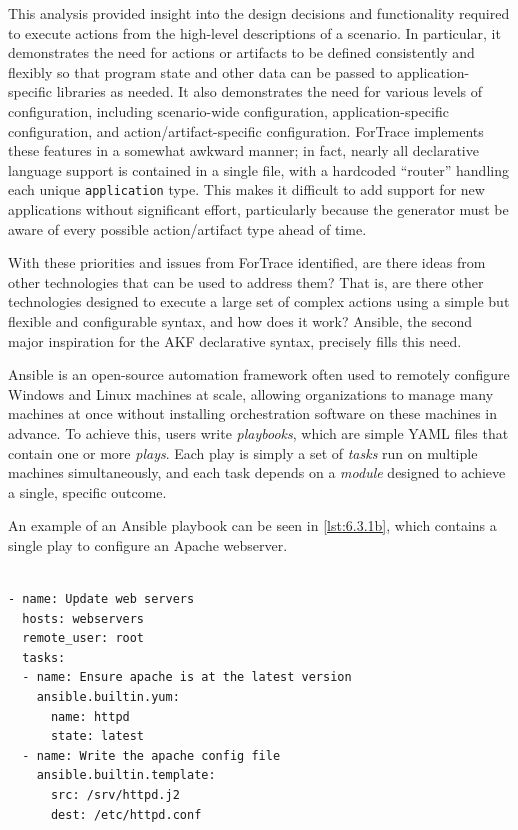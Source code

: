\documentclass[letterpaper,12pt]{report}
\newcommand{\passthrough}[1]{#1}
\begin{document}
This analysis provided insight into the design decisions and
functionality required to execute actions from the high-level
descriptions of a scenario. In particular, it demonstrates the need for
actions or artifacts to be defined consistently and flexibly so that
program state and other data can be passed to application-specific
libraries as needed. It also demonstrates the need for various levels of
configuration, including scenario-wide configuration,
application-specific configuration, and action/artifact-specific
configuration. ForTrace implements these features in a somewhat awkward
manner; in fact, nearly all declarative language support is contained in
a single file, with a hardcoded ``router'' handling each unique
\passthrough{\lstinline!application!} type. This makes it difficult to
add support for new applications without significant effort,
particularly because the generator must be aware of every possible
action/artifact type ahead of time.

With these priorities and issues from ForTrace identified, are there
ideas from other technologies that can be used to address them? That is,
are there other technologies designed to execute a large set of complex
actions using a simple but flexible and configurable syntax, and how
does it work? Ansible, the second major inspiration for the AKF
declarative syntax, precisely fills this need.

Ansible \cite{AnsibleAnsible2025} is an open-source automation
framework often used to remotely configure Windows and Linux machines at
scale, allowing organizations to manage many machines at once without
installing orchestration software on these machines in advance. To
achieve this, users write \emph{playbooks}, which are simple YAML files
that contain one or more \emph{plays}. Each play is simply a set of
\emph{tasks} run on multiple machines simultaneously, and each task
depends on a \emph{module} designed to achieve a single, specific
outcome.

An example of an Ansible playbook can be seen in \autoref{lst:6.3.1b},
which contains a single play to configure an Apache webserver.

\begin{lstlisting}[label={lst:6.3.1b}, caption={Minimal Ansible playbook for updating an Apache server \cite{ansibleprojectcontributorsAnsiblePlaybooks}}, ]

- name: Update web servers
  hosts: webservers
  remote_user: root
  tasks:
  - name: Ensure apache is at the latest version
    ansible.builtin.yum:
      name: httpd
      state: latest
  - name: Write the apache config file
    ansible.builtin.template:
      src: /srv/httpd.j2
      dest: /etc/httpd.conf
\end{lstlisting}
\end{document}
